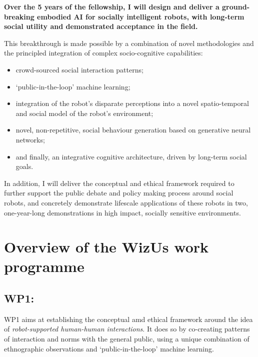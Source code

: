 \documentclass[11pt,a4paper]{report}
\newcommand{\project}{WizUs\xspace}
\begin{document}
\begin{framed}

\bf Over the 5 years of the fellowship, I will design and deliver a ground-breaking embodied AI for
socially intelligent robots, with long-term social utility and demonstrated
    acceptance in the field.
    
This breakthrough is made possible by a combination of novel methodologies and
the principled integration of complex socio-cognitive capabilities:
\begin{itemize}
        \item crowd-sourced social interaction patterns;
        \item `public-in-the-loop' machine learning;
        \item integration of the robot's disparate perceptions into a novel
            spatio-temporal and social model of the robot's environment;
        \item novel, non-repetitive, social behaviour generation based on
            generative neural networks;
        \item and finally, an integrative cognitive architecture, driven by
            long-term social goals.
\end{itemize}

In addition, I will deliver the conceptual and ethical framework required to
further support the public debate and policy making process around social
robots, and concretely demonstrate lifescale applications of these robots in
two, one-year-long demonstrations in high impact, socially sensitive environments.

\end{framed}

\section{Overview of the \project work programme}


\subsection{WP1: \textbf{\wpOne}}

WP1 aims at establishing the conceptual amd ethical framework around the idea of
\emph{robot-supported human-human interactions}. It does so by co-creating
patterns of interaction and norms with the general public, using a unique
combination of ethnographic observations and `public-in-the-loop' machine
learning.
\end{document}
